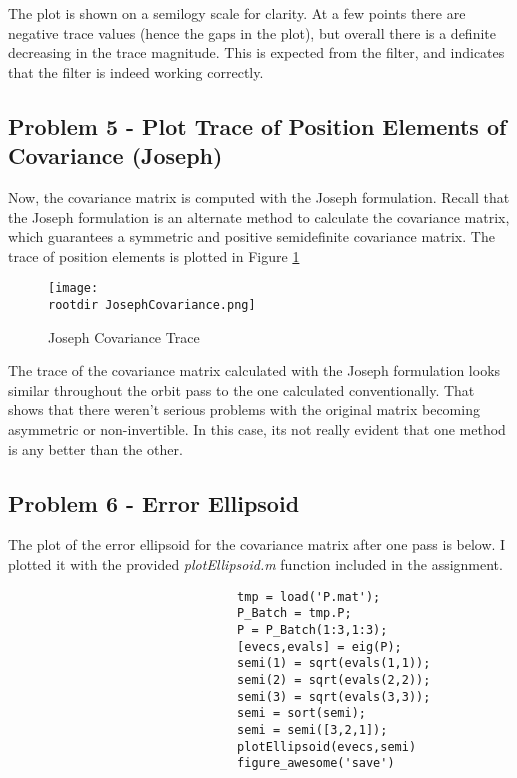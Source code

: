 \documentclass[]{article}
\newcommand{\rootdir}{./Figures/}
\begin{document}
The plot is shown on a semilogy scale for clarity. At a few points there are negative trace values (hence the gaps in the plot), but overall there is a definite decreasing in the trace magnitude. This is expected from the filter, and indicates that the filter is indeed working correctly. 




\subsection{Problem 5 - Plot Trace of Position Elements of Covariance (Joseph)}
Now, the covariance matrix is computed with the Joseph formulation. Recall that the Joseph formulation is an alternate method to calculate the covariance matrix, which guarantees a symmetric and positive semidefinite covariance matrix. The trace of position elements is plotted in Figure \ref{fig:JosephCovariance}

\begin{center}
	\begin{figure}[H]
		\texttt{[image: \\rootdir JosephCovariance.png]}
		\caption{Joseph Covariance Trace}
		\label{fig:JosephCovariance}
	\end{figure}
\end{center}

The trace of the covariance matrix calculated with the Joseph formulation looks similar throughout the orbit pass to the one calculated conventionally. That shows that there weren't serious problems with the original matrix becoming asymmetric or non-invertible. In this case, its not really evident that one method is any better than the other. 


\newpage
\subsection{Problem 6 - Error Ellipsoid}
The plot of the error ellipsoid for the covariance matrix after one pass is below. I plotted it with the provided \emph{plotEllipsoid.m} function included in the assignment. 



\begin{lstlisting}
								tmp = load('P.mat');
								P_Batch = tmp.P;
								P = P_Batch(1:3,1:3);
								[evecs,evals] = eig(P);
								semi(1) = sqrt(evals(1,1));
								semi(2) = sqrt(evals(2,2));
								semi(3) = sqrt(evals(3,3));
								semi = sort(semi);
								semi = semi([3,2,1]);
								plotEllipsoid(evecs,semi)	
								figure_awesome('save')
\end{lstlisting}
\end{document}
